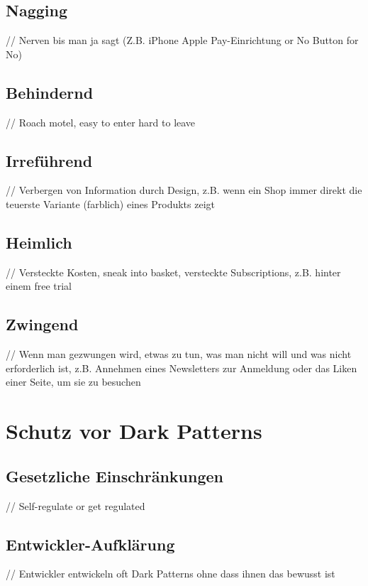 \documentclass[conference,compsoc,final,a4paper]{IEEEtran}
\begin{document}
\subsection{Nagging}
// Nerven bis man ja sagt (Z.B. iPhone Apple Pay-Einrichtung or No Button for No)
\subsection{Behindernd}
// Roach motel, easy to enter hard to leave
\subsection{Irreführend}
\label{chap:Irreführend}
// Verbergen von Information durch Design, z.B. wenn ein Shop immer direkt die teuerste Variante (farblich) eines Produkts zeigt
\subsection{Heimlich}
// Versteckte Kosten, sneak into basket, versteckte Subscriptions, z.B. hinter einem free trial
\subsection{Zwingend}
// Wenn man gezwungen wird, etwas zu tun, was man nicht will und was nicht erforderlich ist, z.B. Annehmen eines Newsletters zur Anmeldung oder das Liken einer Seite, um sie zu besuchen


\section{Schutz vor Dark Patterns}
\subsection{Gesetzliche Einschränkungen}
// Self-regulate or get regulated
\subsection{Entwickler-Aufklärung}
// Entwickler entwickeln oft Dark Patterns ohne dass ihnen das bewusst ist
\end{document}

